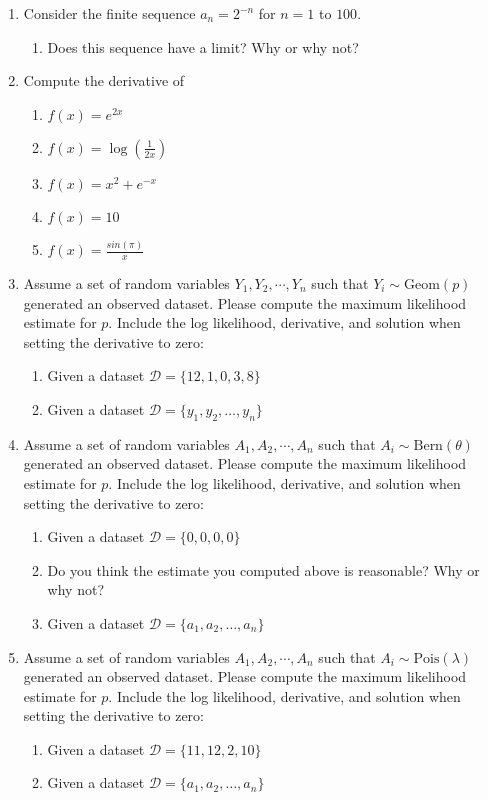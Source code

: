 \begin{enumerate}
    \item Consider the finite sequence $a_{n} = 2^{-n}$ for $n=1$ to $100$. 
    \begin{enumerate}
        \item Does this sequence have a limit? Why or why not?
    \end{enumerate}
    
    \item Compute the derivative of 
    \begin{enumerate}
        \item $f(x) = e^{2x}$
        \item $f(x) = \log(\frac{1}{2x})$
        \item $f(x) = x^{2} + e^{-x}$
        \item $f(x) = 10$
        \item $f(x) = \frac{sin(\pi)}{x}$
    \end{enumerate}
    
    \item  Assume a set of random variables $Y_{1}, Y_{2}, \cdots, Y_{n}$ such that $Y_{i} \sim \text{Geom}(p)$ generated an observed dataset. Please compute the maximum likelihood estimate for $p$. Include the log likelihood, derivative, and solution when setting the derivative to zero: 
    \begin{enumerate}
        \item Given a dataset $\mathcal{D} = \{ 12, 1, 0, 3, 8  \}$
        \item Given a dataset $\mathcal{D} = \{y_{1}, y_{2}, \dots, y_{n}\}$
    \end{enumerate}
    
    \item Assume a set of random variables $A_{1}, A_{2}, \cdots, A_{n}$ such that $A_{i} \sim \text{Bern}(\theta)$ generated an observed dataset. Please compute the maximum likelihood estimate for $p$. Include the log likelihood, derivative, and solution when setting the derivative to zero: 
    \begin{enumerate}
        \item Given a dataset $\mathcal{D} = \{ 0,0,0,0 \}$
        \item Do you think the estimate you computed above is reasonable? Why or why not?
        \item Given a dataset $\mathcal{D} = \{a_{1}, a_{2}, \dots, a_{n}\}$
    \end{enumerate}
    
    \item Assume a set of random variables $A_{1}, A_{2}, \cdots, A_{n}$ such that $A_{i} \sim \text{Pois}(\lambda)$ generated an observed dataset. Please compute the maximum likelihood estimate for $p$. Include the log likelihood, derivative, and solution when setting the derivative to zero: 
    \begin{enumerate}
        \item Given a dataset $\mathcal{D} = \{ 11,12,2,10 \}$
        \item Given a dataset $\mathcal{D} = \{a_{1}, a_{2}, \dots, a_{n}\}$
    \end{enumerate}
    

\end{enumerate}
